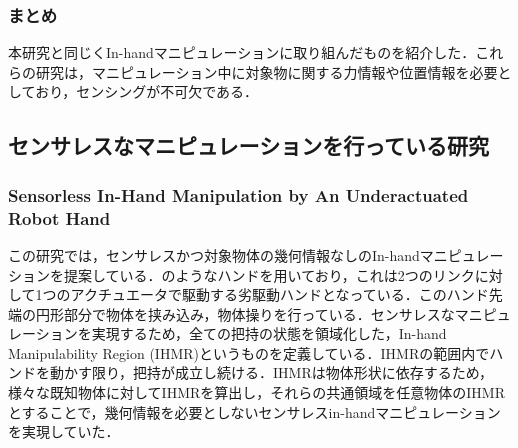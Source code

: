 \documentclass[a4paper,twoside,12pt,papersize, dvipdfmx]{iirthesis}
\begin{document}
\subsubsection{まとめ}
本研究と同じくIn-handマニピュレーションに取り組んだものを紹介した．これらの研究は，マニピュレーション中に対象物に関する力情報や位置情報を必要としており，センシングが不可欠である．


\subsection{センサレスなマニピュレーションを行っている研究}
\subsubsection{Sensorless In-Hand Manipulation by An Underactuated Robot Hand \cite{ospina2020}}	\label{sec::ospina}
この研究では，センサレスかつ対象物体の幾何情報なしのIn-handマニピュレーションを提案している．のようなハンドを用いており，これは2つのリンクに対して1つのアクチュエータで駆動する劣駆動ハンドとなっている．このハンド先端の円形部分で物体を挟み込み，物体操りを行っている．センサレスなマニピュレーションを実現するため，全ての把持の状態を領域化した，In-hand Manipulability Region (IHMR)というものを定義している．IHMRの範囲内でハンドを動かす限り，把持が成立し続ける．IHMRは物体形状に依存するため，様々な既知物体に対してIHMRを算出し，それらの共通領域を任意物体のIHMRとすることで，幾何情報を必要としないセンサレスin-handマニピュレーションを実現していた．
\end{document}
